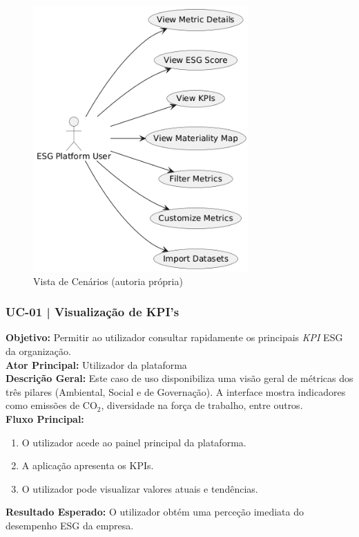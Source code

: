 \begin{figure}[H]
    \centering
    \includegraphics[height=4in,keepaspectratio]{frontmatter/assets/diagrams/Scenario View/Scenario_View.png}
    \caption{Vista de Cenários (autoria própria)}
    \label{fig:scenario_view}
\end{figure}

\subsubsection{UC-01 | Visualização de KPI's}

\textbf{Objetivo:} Permitir ao utilizador consultar rapidamente os principais \textit{\gls{KPI}} ESG da organização. \\
\textbf{Ator Principal:} Utilizador da plataforma \\
\textbf{Descrição Geral:} Este caso de uso disponibiliza uma visão geral de métricas dos três pilares (Ambiental, Social e de Governação). A interface mostra indicadores como emissões de CO$_2$, diversidade na força de trabalho, entre outros. \\
\textbf{Fluxo Principal:}
\begin{enumerate}
    \item O utilizador acede ao painel principal da plataforma.
    \item A aplicação apresenta os KPIs.
    \item O utilizador pode visualizar valores atuais e tendências.
\end{enumerate}
\textbf{Resultado Esperado:} O utilizador obtém uma perceção imediata do desempenho ESG da empresa.

